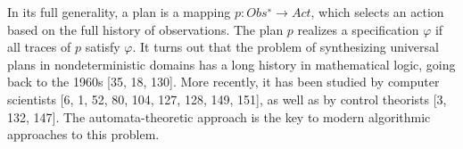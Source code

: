 In its full generality, a plan is a mapping $p : Obs^∗ \rightarrow Act$, which selects an action based on the full history of observations. The plan $p$ realizes a specification $\varphi$  if all traces of $p$ satisfy $\varphi$. 
It turns out that the problem of synthesizing universal plans in nondeterministic domains has a long history in mathematical logic, going back to the 1960s [35, 18, 130]. More recently, it has been studied by computer scientists [6, 1, 52, 80, 104, 127, 128, 149, 151], as well as by control theorists [3, 132, 147]. The automata-theoretic approach is the key to modern algorithmic approaches to this problem. 











